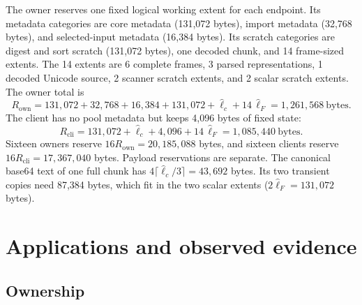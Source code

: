 \documentclass[11pt,a4paper]{article}
\theoremstyle{definition}
\begin{document}
The owner reserves one fixed logical working extent for each endpoint. Its metadata
categories are core metadata (131,072 bytes), import metadata (32,768 bytes), and
selected-input metadata (16,384 bytes). Its scratch categories are digest and sort
scratch (131,072 bytes), one decoded chunk, and 14 frame-sized extents. The 14 extents are 6 complete frames, 3 parsed
representations, 1 decoded Unicode source, 2 scanner scratch extents, and 2 scalar
scratch extents. The owner total is
\begin{equation}\label{eq:owner-extent}
R_{\mathrm{own}}=131{,}072+32{,}768+16{,}384+131{,}072+\hat\ell_c+14\,\hat\ell_F
=1{,}261{,}568\ \text{bytes}.
\end{equation}
The client has no pool metadata but keeps 4,096 bytes of fixed state:
\begin{equation}\label{eq:client-extent}
R_{\mathrm{cli}}=131{,}072+\hat\ell_c+4{,}096+14\,\hat\ell_F=1{,}085{,}440\ \text{bytes}.
\end{equation}
Sixteen owners reserve $16R_{\mathrm{own}}=20{,}185{,}088$ bytes, and sixteen clients
reserve $16R_{\mathrm{cli}}=17{,}367{,}040$ bytes. Payload reservations are separate.
The canonical base64 text of one full chunk has $4\lceil\hat\ell_c/3\rceil=43{,}692$
bytes. Its two transient copies need 87,384 bytes, which fit in the two scalar
extents ($2\hat\ell_F=131{,}072$ bytes).

\section{Applications and observed evidence}


\subsection{Ownership}
\end{document}
